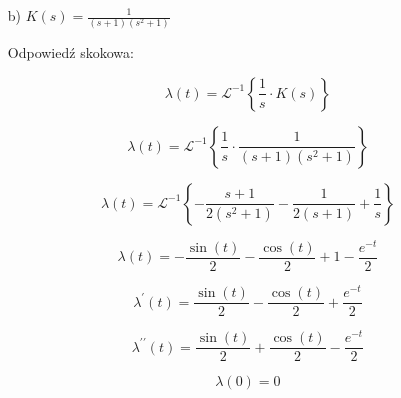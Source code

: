 \documentclass{article}
\begin{document}
\begin{enumerate}
    
    
    
    
    \item[b)]  $K(s)=\frac{1}{\left(s + 1\right) \left(s^{2} + 1\right)}$

    Odpowiedź skokowa:

    $$ \lambda(t)=\mathcal{L}^{-1}\left\{\frac{1}{s}\cdot K(s)\right\} $$

    $$ \lambda(t)=\mathcal{L}^{-1}\left\{\frac{1}{s}\cdot \frac{1}{\left(s + 1\right) \left(s^{2} + 1\right)}\right\} $$

    $$ \lambda(t)= \mathcal{L}^{-1}\left\{- \frac{s + 1}{2 \left(s^{2} + 1\right)} - \frac{1}{2 \left(s + 1\right)} + \frac{1}{s}
    \right\}$$

    $$ \lambda(t)=- \frac{\sin{\left(t \right)}}{2} - \frac{\cos{\left(t \right)}}{2} + 1 - \frac{e^{- t}}{2} $$

    $$ \lambda^{\prime}(t)=\frac{\sin{\left(t \right)}}{2} - \frac{\cos{\left(t \right)}}{2} + \frac{e^{- t}}{2}$$

    $$ \lambda^{\prime\prime}(t)=\frac{\sin{\left(t \right)}}{2} + \frac{\cos{\left(t \right)}}{2} - \frac{e^{- t}}{2}$$

    $$ \lambda(0)= 0 $$


\end{enumerate}
\end{document}

